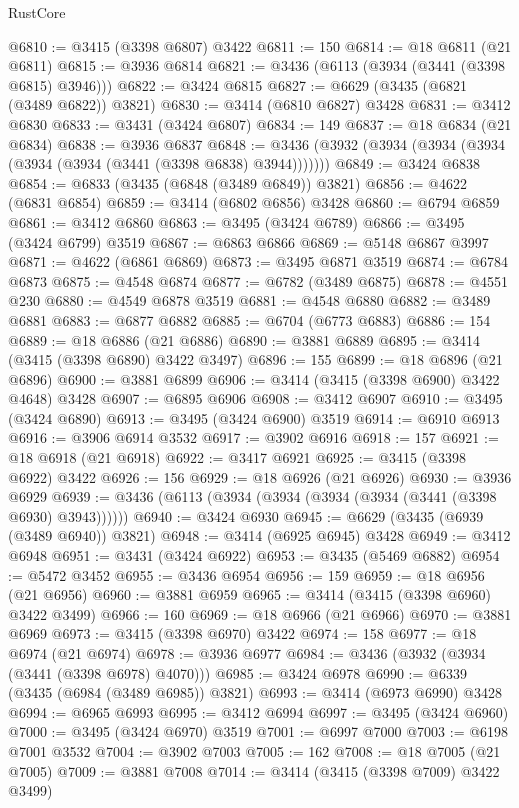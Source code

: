 \begin{lexlean}{RustCore}
\begin{coremodule}
@6810 := @3415 (@3398 @6807) @3422
@6811 := 150
@6814 := @18 @6811 (@21 @6811)
@6815 := @3936 @6814
@6821 := @3436 (@6113 (@3934 (@3441 (@3398 @6815) @3946)))
@6822 := @3424 @6815
@6827 := @6629 (@3435 (@6821 (@3489 @6822)) @3821)
@6830 := @3414 (@6810 @6827) @3428
@6831 := @3412 @6830
@6833 := @3431 (@3424 @6807)
@6834 := 149
@6837 := @18 @6834 (@21 @6834)
@6838 := @3936 @6837
@6848 := @3436 (@3932 (@3934 (@3934 (@3934 (@3934 (@3934 (@3441 (@3398 @6838) @3944)))))))
@6849 := @3424 @6838
@6854 := @6833 (@3435 (@6848 (@3489 @6849)) @3821)
@6856 := @4622 (@6831 @6854)
@6859 := @3414 (@6802 @6856) @3428
@6860 := @6794 @6859
@6861 := @3412 @6860
@6863 := @3495 (@3424 @6789)
@6866 := @3495 (@3424 @6799) @3519
@6867 := @6863 @6866
@6869 := @5148 @6867 @3997
@6871 := @4622 (@6861 @6869)
@6873 := @3495 @6871 @3519
@6874 := @6784 @6873
@6875 := @4548 @6874
@6877 := @6782 (@3489 @6875)
@6878 := @4551 @230
@6880 := @4549 @6878 @3519
@6881 := @4548 @6880
@6882 := @3489 @6881
@6883 := @6877 @6882
@6885 := @6704 (@6773 @6883)
@6886 := 154
@6889 := @18 @6886 (@21 @6886)
@6890 := @3881 @6889
@6895 := @3414 (@3415 (@3398 @6890) @3422 @3497)
@6896 := 155
@6899 := @18 @6896 (@21 @6896)
@6900 := @3881 @6899
@6906 := @3414 (@3415 (@3398 @6900) @3422 @4648) @3428
@6907 := @6895 @6906
@6908 := @3412 @6907
@6910 := @3495 (@3424 @6890)
@6913 := @3495 (@3424 @6900) @3519
@6914 := @6910 @6913
@6916 := @3906 @6914 @3532
@6917 := @3902 @6916
@6918 := 157
@6921 := @18 @6918 (@21 @6918)
@6922 := @3417 @6921
@6925 := @3415 (@3398 @6922) @3422
@6926 := 156
@6929 := @18 @6926 (@21 @6926)
@6930 := @3936 @6929
@6939 := @3436 (@6113 (@3934 (@3934 (@3934 (@3934 (@3441 (@3398 @6930) @3943))))))
@6940 := @3424 @6930
@6945 := @6629 (@3435 (@6939 (@3489 @6940)) @3821)
@6948 := @3414 (@6925 @6945) @3428
@6949 := @3412 @6948
@6951 := @3431 (@3424 @6922)
@6953 := @3435 (@5469 @6882)
@6954 := @5472 @3452
@6955 := @3436 @6954
@6956 := 159
@6959 := @18 @6956 (@21 @6956)
@6960 := @3881 @6959
@6965 := @3414 (@3415 (@3398 @6960) @3422 @3499)
@6966 := 160
@6969 := @18 @6966 (@21 @6966)
@6970 := @3881 @6969
@6973 := @3415 (@3398 @6970) @3422
@6974 := 158
@6977 := @18 @6974 (@21 @6974)
@6978 := @3936 @6977
@6984 := @3436 (@3932 (@3934 (@3441 (@3398 @6978) @4070)))
@6985 := @3424 @6978
@6990 := @6339 (@3435 (@6984 (@3489 @6985)) @3821)
@6993 := @3414 (@6973 @6990) @3428
@6994 := @6965 @6993
@6995 := @3412 @6994
@6997 := @3495 (@3424 @6960)
@7000 := @3495 (@3424 @6970) @3519
@7001 := @6997 @7000
@7003 := @6198 @7001 @3532
@7004 := @3902 @7003
@7005 := 162
@7008 := @18 @7005 (@21 @7005)
@7009 := @3881 @7008
@7014 := @3414 (@3415 (@3398 @7009) @3422 @3499)

\end{coremodule}
\end{lexlean}

